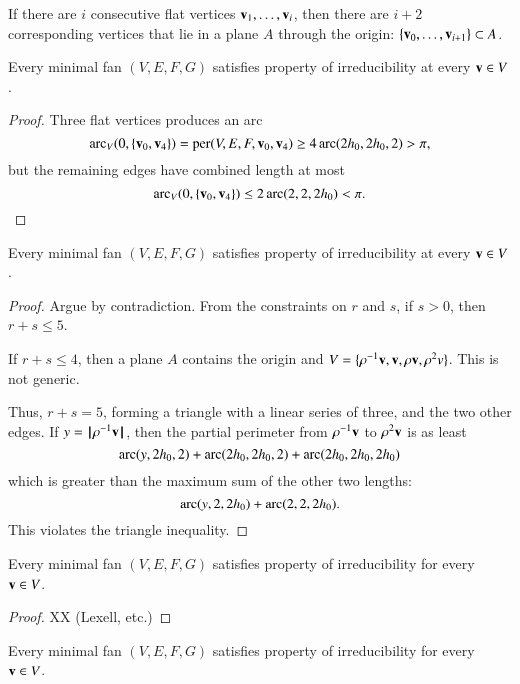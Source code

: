  If there are $i$ consecutive flat vertices ${\mathbf v}_1,\ldots,{\mathbf v}_i$, then there are  $i+2$ corresponding vertices that lie in a plane $A$ through the origin: $\{{\mathbf v}_0,\ldots,{\mathbf v}_{i+1}\}\subset A$.


\begin{lemma}
Every minimal fan $(V,E,F,G)$ satisfies property  of irreducibility at every ${\mathbf v}\in V$.  
\end{lemma}

\begin{proof}  Three flat vertices produces an arc
$$
\operatorname{arc}_V(0,\{{\mathbf v}_0,{\mathbf v}_4\}) = {\operatorname{per}}(V,E,F,{\mathbf v}_0,{\mathbf v}_4) \ge4\operatorname{arc}(2{h_0},2{h_0},2) > \pi,
$$
but the remaining edges  have combined length at most
$$
\operatorname{arc}_V(0,\{{\mathbf v}_0,{\mathbf v}_4\})\le 2\operatorname{arc}(2,2,2{h_0}) < \pi.
$$
\end{proof}


\begin{lemma}
Every minimal fan $(V,E,F,G)$ satisfies property  of irreducibility at every ${\mathbf v}\in V$.
\end{lemma}

\begin{proof}  Argue by contradiction.  From the constraints on $r$ and $s$, if $s>0$, then $r+s\le 5$. 

If $r+s\le 4$, then a plane $A$ contains the origin and $V = \{\rho^{-1}{\mathbf v},{\mathbf v},\rho {\mathbf v},\rho^2v\}$.  This is not generic.

Thus, $r+s=5$, forming a triangle with a linear series of three, and the two other edges.  If $y={{\hskip0.1em|\hskip-0.15em|\hskip0.1em}\rho^{-1} {\mathbf v}{\hskip0.1em|\hskip-0.15em|\hskip0.1em}}$, then the partial perimeter from $\rho^{-1}{\mathbf v}$ to $\rho^2 {\mathbf v}$ is as least
$$
\operatorname{arc}(y,2{h_0},2)+\operatorname{arc}(2{h_0},2{h_0},2) +\operatorname{arc}(2{h_0},2{h_0},2{h_0})
$$
which is greater than the maximum sum of the other two lengths:
$$
\operatorname{arc}(y,2,2{h_0})+\operatorname{arc}(2,2,2{h_0}).
$$
This violates the triangle inequality.
\end{proof}

\begin{lemma}
Every minimal fan $(V,E,F,G)$ satisfies property  of irreducibility for
every ${\mathbf v}\in V$.
\end{lemma}

\begin{proof} XX (Lexell, etc.)
\end{proof}


\begin{lemma}
Every minimal fan $(V,E,F,G)$ satisfies property  of irreducibility  for
every ${\mathbf v}\in V$.
\end{lemma}

